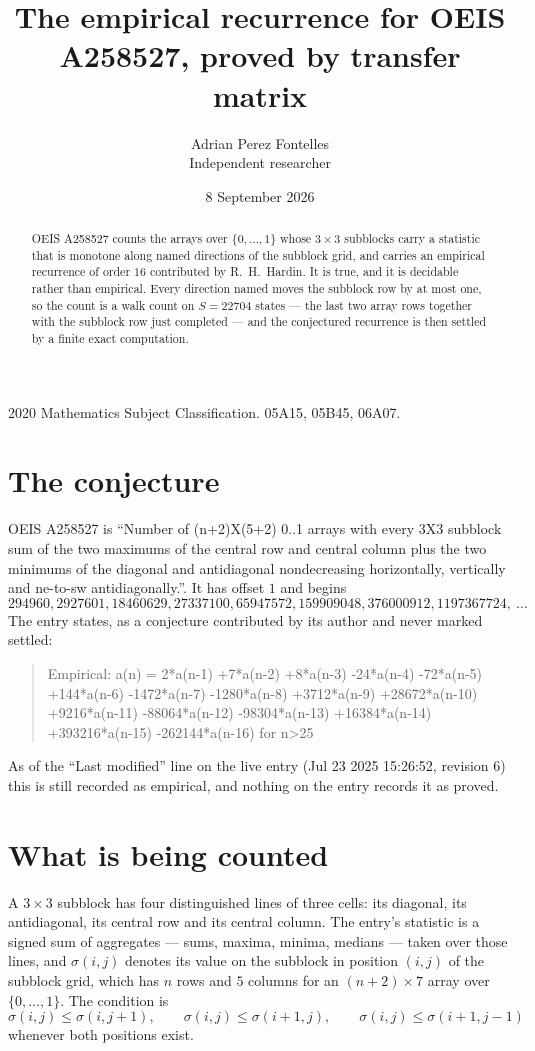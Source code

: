 \documentclass[11pt,a4paper]{article}
\title{The empirical recurrence for OEIS A258527, proved by transfer matrix}
\author{Adrian Perez Fontelles\\ \small Independent researcher}
\date{8 September 2026}
\theoremstyle{plain}
\theoremstyle{definition}
\begin{document}
\maketitle

\begin{abstract}
OEIS A258527 counts the arrays over $\{0,\dots,1\}$ whose $3\times3$ subblocks carry a
statistic that is monotone along named directions of the subblock grid, and carries an
empirical recurrence of order $16$ contributed by R.~H.~Hardin. It is true, and it is
decidable rather than empirical. Every direction named moves the subblock row by at most one,
so the count is a walk count on $S=22704$ states --- the last two array rows together with the
subblock row just completed --- and the conjectured recurrence is then settled by a finite
exact computation.
\end{abstract}

\noindent\small 2020 Mathematics Subject Classification. 05A15, 05B45, 06A07.\normalsize

\section{The conjecture}

OEIS A258527 is ``Number of (n+2)X(5+2) 0..1 arrays with every 3X3 subblock sum of the two maximums of the central row and central column plus the two minimums of the diagonal and antidiagonal nondecreasing horizontally, vertically and ne-to-sw antidiagonally.''. It has offset $1$ and begins
\[
294960, 2927601, 18460629, 27337100, 65947572, 159909048, 376000912, 1197367724,\ \dots
\]
The entry states, as a conjecture contributed by its author and never marked settled:
\begin{quote}
Empirical: a(n) = 2*a(n-1) +7*a(n-2) +8*a(n-3) -24*a(n-4) -72*a(n-5) +144*a(n-6) -1472*a(n-7) -1280*a(n-8) +3712*a(n-9) +28672*a(n-10) +9216*a(n-11) -88064*a(n-12) -98304*a(n-13) +16384*a(n-14) +393216*a(n-15) -262144*a(n-16) for n>25
\end{quote}
As of the ``Last modified'' line on the live entry (Jul 23 2025 15:26:52, revision 6) this is still
recorded as empirical, and nothing on the entry records it as proved.

\section{What is being counted}

A $3\times3$ subblock has four distinguished lines of three cells: its diagonal, its
antidiagonal, its central row and its central column. The entry's statistic is a signed sum of
aggregates --- sums, maxima, minima, medians --- taken over those lines, and $\sigma(i,j)$
denotes its value on the subblock in position $(i,j)$ of the subblock grid, which has $n$ rows
and $5$ columns for an $(n+2)\times7$ array over $\{0,\dots,1\}$. The condition is
\[
\sigma(i,j)\le\sigma(i,j+1),\qquad \sigma(i,j)\le\sigma(i+1,j),\qquad \sigma(i,j)\le\sigma(i+1,j-1)
\]
whenever both positions exist.
\end{document}
